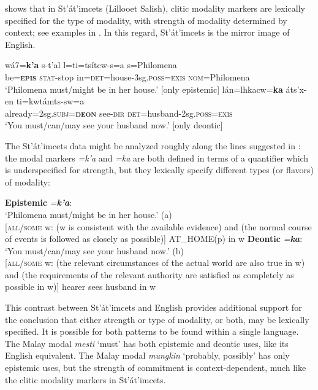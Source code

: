 \citet{Matthewson2010} shows that in St’át’imcets (Lillooet Salish), clitic modality markers are lexically specified for the type of modality, with strength of modality determined by context; see examples in . In this regard, St’át’imcets is the mirror image of English.


\ea \label{ex:16.25}
\ea   \gll wá7=\textbf{k’a}  s-t’al  l=ti=tsítcw-s=a  s=Philomena\\
be=\textbf{\textsc{epis}}  \textsc{stat}-stop  in=\textsc{det}=house-3sg.\textsc{poss}=\textsc{exis}  \textsc{nom}=Philomena\\
\glt ‘Philomena must/might be in her house.’   [only epistemic]
\ex \gll lán=lhkacw=\textbf{ka}  áts’x-en  ti=kwtámts-sw=a\\
already=2sg.\textsc{subj}=\textbf{\textsc{deon}}  see-\textsc{dir}  \textsc{det}=husband-2sg.\textsc{poss}=\textsc{exis}\\
\glt ‘You must/can/may see your husband now.’   [only deontic]
\z \z


The St’át’imcets data might be analyzed roughly along the lines suggested in : the modal markers \textit{=k’a} and \textit{=ka} are both defined in terms of a quantifier which is underspecified for strength, but they lexically specify different types (or flavors) of modality:


\ea \label{ex:16.26}
\ea 
\textbf{Epistemic} \textit{=}\textbf{\textit{k’a}}:\\
‘Philomena must/might be in her house.’ (a)\\
{}[\textsc{all/some} w: (w is consistent with the available evidence) and (the normal course of events is followed as closely as possible)] AT\_HOME(p) in w
\ex 
 \textbf{Deontic} \textit{=}\textbf{\textit{ka}}:\\
‘You must/can/may see your husband now.’ (b)\\
{}[\textsc{all/some} w: (the relevant circumstances of the actual world are also true in w) and (the requirements of the relevant authority are satisfied as completely as possible in w)] hearer sees husband in w
\z \z


This contrast between St’át’imcets and English provides additional support for the conclusion that either strength or type of modality, or both, may be lexically specified. It is possible for both patterns to be found within a single language. The Malay modal \textit{mesti} ‘must’ has both epistemic and deontic uses, like its English equivalent. The Malay modal \textit{mungkin} ‘probably, possibly’ has only epistemic uses, but the strength of commitment is context-dependent, much like the clitic modality markers in St’át’imcets.

